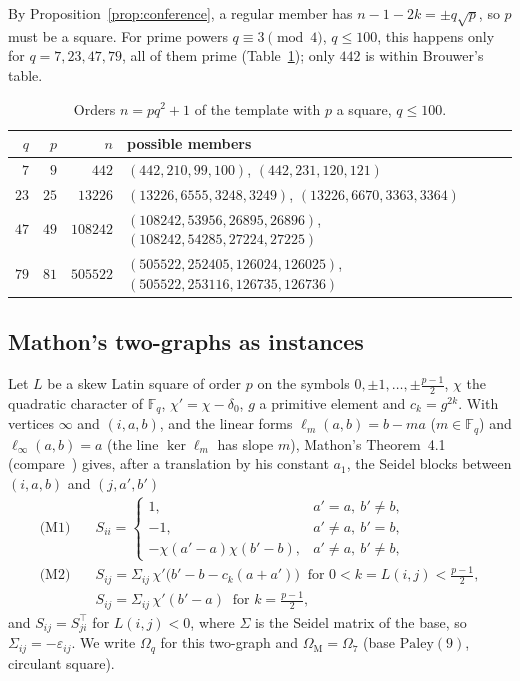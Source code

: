 \documentclass[11pt]{amsart}
\theoremstyle{definition}
\theoremstyle{remark}
\newcommand{\F}{\mathbb{F}}
\newcommand{\Pal}{\mathrm{Paley}}
\newcommand{\OM}{\Omega_{\mathrm M}}   %
\begin{document}
By Proposition~\ref{prop:conference}, a regular member has $n-1-2k=\pm q\sqrt p$, so $p$ must be a square. For prime powers
$q\equiv3\pmod4$, $q\le100$, this happens only for $q=7,23,47,79$, all of them prime (Table~\ref{tab:orders}); only $442$ is within Brouwer's table.

\begin{table}[h]
\centering
{\small\setlength{\tabcolsep}{4pt}\begin{tabular}{rrrl}
\toprule
$q$ & $p$ & $n$ & possible members\\
\midrule
$7$ & $9$ & $442$ & $(442,210,99,100)$, $(442,231,120,121)$\\
$23$ & $25$ & $13226$ & $(13226,6555,3248,3249)$, $(13226,6670,3363,3364)$\\
$47$ & $49$ & $108242$ & $(108242,53956,26895,26896)$, $(108242,54285,27224,27225)$\\
$79$ & $81$ & $505522$ & $(505522,252405,126024,126025)$, $(505522,253116,126735,126736)$\\
\bottomrule
\end{tabular}}
\caption{Orders $n=pq^2+1$ of the template with $p$ a square, $q\le100$.}
\label{tab:orders}
\end{table}

\subsection{Mathon's two-graphs as instances}
Let $L$ be a skew Latin square of order $p$ on the symbols $0,\pm1,\dots,\pm\frac{p-1}2$, $\chi$ the quadratic character of
$\F_q$, $\chi'=\chi-\delta_0$, $g$ a primitive element and $c_k=g^{2k}$. With vertices $\infty$ and $(i,a,b)$, and the linear forms
$\ell_m(a,b)=b-ma$ ($m\in\F_q$) and $\ell_\infty(a,b)=a$ (the line $\ker\ell_m$ has slope $m$), Mathon's
Theorem~4.1~\cite{Mathon1978} (compare~\cite{SeberryWhiteman1988}) gives, after a translation by his constant $a_1$, the Seidel blocks between $(i,a,b)$ and $(j,a',b')$
\begin{align*}
\text{(M1)}\quad&S_{ii}=\begin{cases}1,&a'=a,\ b'\ne b,\\-1,&a'\ne a,\ b'=b,\\-\chi(a'-a)\chi(b'-b),&a'\ne a,\ b'\ne b,\end{cases}\\
\text{(M2)}\quad&S_{ij}=\Sigma_{ij}\,\chi'\bigl(b'-b-c_k(a+a')\bigr)\ \text{ for } 0<k=L(i,j)<\tfrac{p-1}2,\\
&S_{ij}=\Sigma_{ij}\,\chi'(b'-a)\ \text{ for } k=\tfrac{p-1}2,
\end{align*}
and $S_{ij}=S_{ji}^\top$ for $L(i,j)<0$, where $\Sigma$ is the Seidel matrix of the base, so $\Sigma_{ij}=-\varepsilon_{ij}$. We write $\Omega_q$ for this
two-graph and $\OM=\Omega_7$ (base $\Pal(9)$, circulant square).
\end{document}
